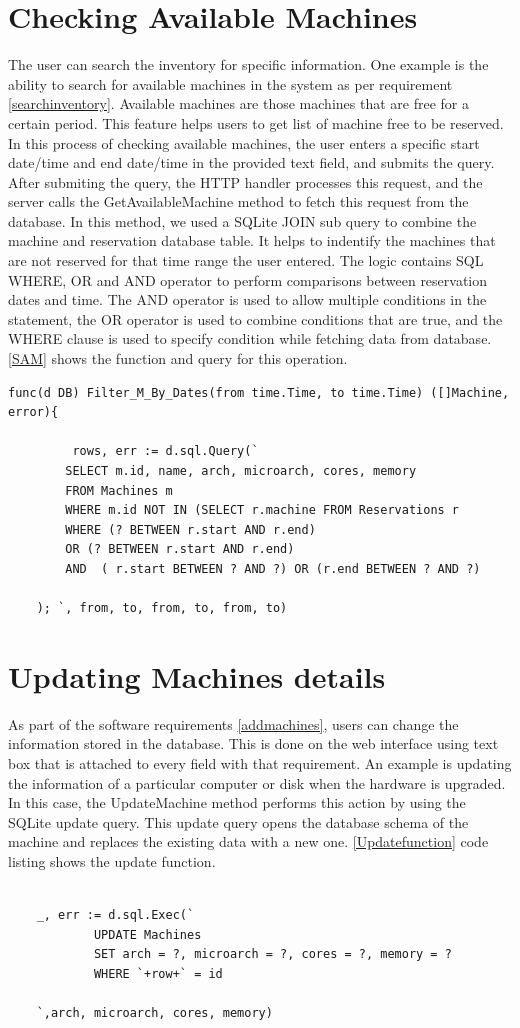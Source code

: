 \section*{Checking Available Machines}
The user can search the inventory for specific information. One example is the ability to search for available machines in the system as per requirement \ref{searchinventory}. Available machines are those machines that are free for a certain period. This feature helps users to get list of machine free to be reserved. In this process of checking available machines, the user enters a specific start date/time and end date/time in the provided text field, and submits the query. After submiting the query, the HTTP handler processes this request, and the server calls the GetAvailableMachine method to fetch this request from the database. In this method, we used a SQLite JOIN sub query to combine the machine and reservation database table. It helps to indentify the machines that are not reserved for that time range the user entered. The logic contains SQL WHERE, OR and AND operator to perform comparisons between reservation dates and time. \cite{ANDOR}The AND operator is used to allow multiple conditions in the statement,  the OR operator is used to combine conditions that are true, and the WHERE clause is used to specify condition while fetching data from database\cite{WHEREclause}. 
\autoref{SAM} shows the function and query for this operation.
\begin{lstlisting}[caption=Searching available, label=SAM]
func(d DB) Filter_M_By_Dates(from time.Time, to time.Time) ([]Machine, error){

         rows, err := d.sql.Query(`
		SELECT m.id, name, arch, microarch, cores, memory
		FROM Machines m
		WHERE m.id NOT IN (SELECT r.machine FROM Reservations r
		WHERE (? BETWEEN r.start AND r.end)
		OR (? BETWEEN r.start AND r.end)
		AND  ( r.start BETWEEN ? AND ?) OR (r.end BETWEEN ? AND ?)
	
	); `, from, to, from, to, from, to)
\end{lstlisting}
\section*{Updating Machines details}
As part of the software requirements \ref{addmachines}, users can change the information stored in the database. This is done on the web interface using text box that is attached to every field with that requirement. An example is updating the information of a particular computer or disk when the hardware is upgraded. In this case, the UpdateMachine method performs this action by using the SQLite update query. This update query opens the database schema of the machine and replaces the existing data with a new one.
\autoref{Updatefunction} code listing shows the update function.
\begin{lstlisting}[caption=Function for Updating data, label=Updatefunction]

	_, err := d.sql.Exec(`
			UPDATE Machines
			SET arch = ?, microarch = ?, cores = ?, memory = ?
			WHERE `+row+` = id

	`,arch, microarch, cores, memory)

\end{lstlisting}
